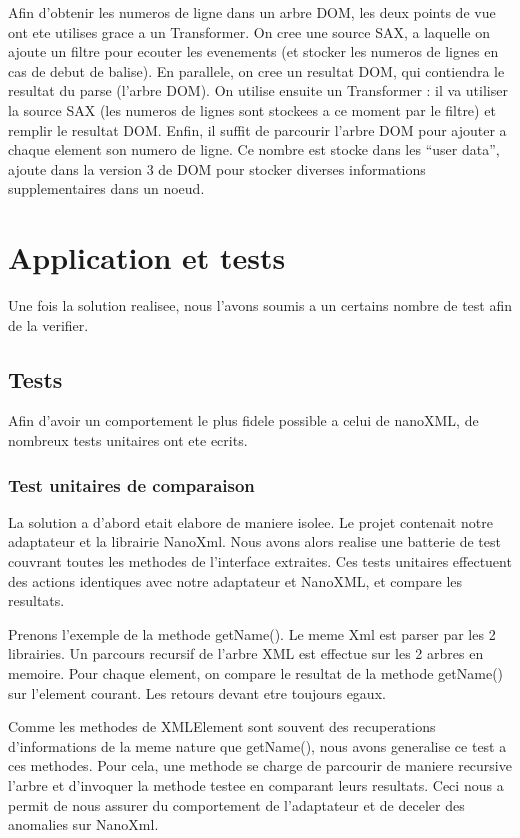 Afin d'obtenir les numeros de ligne dans un arbre DOM, les deux points de vue ont ete utilises grace a un Transformer.
On cree une source SAX, a laquelle on ajoute un filtre pour ecouter les evenements (et stocker les numeros de lignes en cas de debut de balise).
En parallele, on cree un resultat DOM, qui contiendra le resultat du parse (l'arbre DOM).
On utilise ensuite un Transformer : il va utiliser la source SAX (les numeros de lignes sont stockees a ce moment par le filtre) et remplir le resultat DOM.
Enfin, il suffit de parcourir l'arbre DOM pour ajouter a chaque element son numero de ligne.
Ce nombre est stocke dans les ``user data'', ajoute dans la version 3  de DOM pour stocker diverses informations supplementaires dans un noeud.
\section{Application et tests}
Une fois la solution realisee, nous l'avons soumis a un certains nombre de test afin de la verifier.
\subsection{Tests}
Afin d'avoir un comportement le plus fidele possible a celui de nanoXML, de nombreux tests unitaires ont ete ecrits.
\subsubsection{Test unitaires de comparaison}
La solution a d'abord etait elabore de maniere isolee. Le projet contenait notre adaptateur et la librairie NanoXml. Nous avons alors realise une batterie de test couvrant toutes les methodes de l'interface extraites. Ces tests unitaires effectuent des actions identiques avec notre adaptateur et NanoXML, et compare les resultats. 

Prenons l'exemple de la methode getName(). Le meme Xml est parser par les 2 librairies. Un parcours recursif de l'arbre XML est effectue sur les 2 arbres en memoire. Pour chaque element, on compare le resultat de la methode getName() sur l'element courant. Les retours devant etre toujours egaux.

Comme les methodes de XMLElement sont souvent des recuperations d'informations de la meme nature que getName(), nous avons generalise ce test a ces methodes. Pour cela, une methode se charge de parcourir de maniere recursive l'arbre et d'invoquer la methode testee en comparant leurs resultats. Ceci nous a permit de nous assurer du comportement de l'adaptateur et de deceler des anomalies sur NanoXml.

